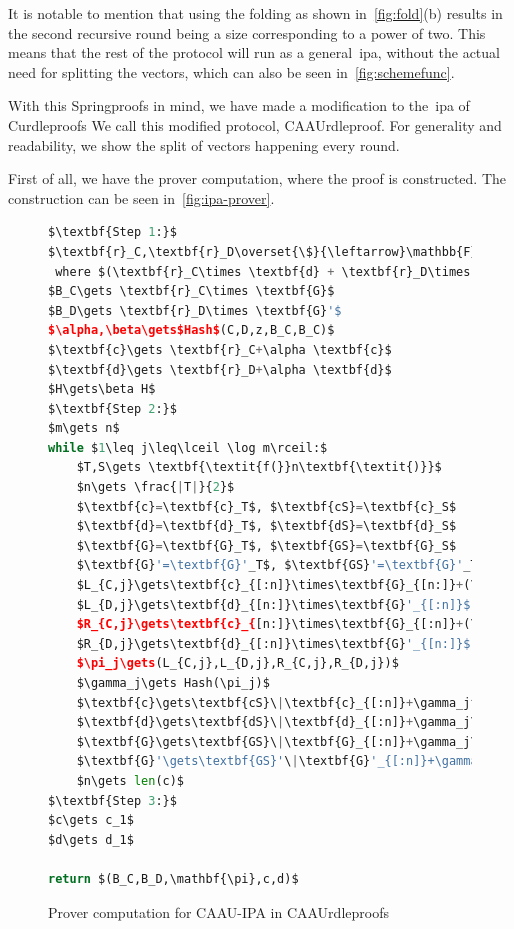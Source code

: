 It is notable to mention that using the folding as shown in~\autoref{fig:fold}(b) results in the second recursive round being a size corresponding to a power of two.
This means that the rest of the protocol will run as a general~\gls{ipa}, without the actual need for splitting the vectors, which can also be seen in~\autoref{fig:schemefunc}.

With this Springproofs in mind, we have made a modification to the~\gls{ipa} of Curdleproofs
We call this modified protocol, CAAUrdleproof.
For generality and readability, we show the split of vectors happening every round.

First of all, we have the prover computation, where the proof is constructed.
The construction can be seen in~\autoref{fig:ipa-prover}.

\begin{figure}[ht]
\begin{framed}
    \begin{lstlisting}[language=Python,mathescape=true,label={lst:ipa-prover}]
$\textbf{Step 1:}$
$\textbf{r}_C,\textbf{r}_D\overset{\$}{\leftarrow}\mathbb{F}^n$
 where $(\textbf{r}_C\times \textbf{d} + \textbf{r}_D\times \textbf{c})=0\text{ and }\textbf{r}_C\times \textbf{r}_D=0$
$B_C\gets \textbf{r}_C\times \textbf{G}$
$B_D\gets \textbf{r}_D\times \textbf{G}'$
$\alpha,\beta\gets$Hash$(C,D,z,B_C,B_C)$
$\textbf{c}\gets \textbf{r}_C+\alpha \textbf{c}$
$\textbf{d}\gets \textbf{r}_D+\alpha \textbf{d}$
$H\gets\beta H$
$\textbf{Step 2:}$
$m\gets n$
while $1\leq j\leq\lceil \log m\rceil:$
    $T,S\gets \textbf{\textit{f(}}n\textbf{\textit{)}}$
    $n\gets \frac{|T|}{2}$
    $\textbf{c}=\textbf{c}_T$, $\textbf{cS}=\textbf{c}_S$
    $\textbf{d}=\textbf{d}_T$, $\textbf{dS}=\textbf{d}_S$
    $\textbf{G}=\textbf{G}_T$, $\textbf{GS}=\textbf{G}_S$
    $\textbf{G}'=\textbf{G}'_T$, $\textbf{GS}'=\textbf{G}'_T$
    $L_{C,j}\gets\textbf{c}_{[:n]}\times\textbf{G}_{[n:]}+(\textbf{c}_{[:n]}\times\textbf{d}_{[n:]})H$
    $L_{D,j}\gets\textbf{d}_{[n:]}\times\textbf{G}'_{[:n]}$
    $R_{C,j}\gets\textbf{c}_{[n:]}\times\textbf{G}_{[:n]}+(\textbf{c}_{[n:]}\times\textbf{d}_{[:n]})H$
    $R_{D,j}\gets\textbf{d}_{[:n]}\times\textbf{G}'_{[n:]}$
    $\pi_j\gets(L_{C,j},L_{D,j},R_{C,j},R_{D,j})$
    $\gamma_j\gets Hash(\pi_j)$
    $\textbf{c}\gets\textbf{cS}\|\textbf{c}_{[:n]}+\gamma_j^{-1}\textbf{c}_{[n:]}$
    $\textbf{d}\gets\textbf{dS}\|\textbf{d}_{[:n]}+\gamma_j\textbf{d}_{[n:]}$
    $\textbf{G}\gets\textbf{GS}\|\textbf{G}_{[:n]}+\gamma_j\textbf{G}_{[n:]}$
    $\textbf{G}'\gets\textbf{GS}'\|\textbf{G}'_{[:n]}+\gamma_j^{-1}\textbf{G}'_{[n:]}$
    $n\gets len(c)$
$\textbf{Step 3:}$
$c\gets c_1$
$d\gets d_1$

return $(B_C,B_D,\mathbf{\pi},c,d)$
    \end{lstlisting}
\end{framed}
\caption{Prover computation for CAAU-IPA in CAAUrdleproofs}
\label{fig:ipa-prover}
\end{figure}

